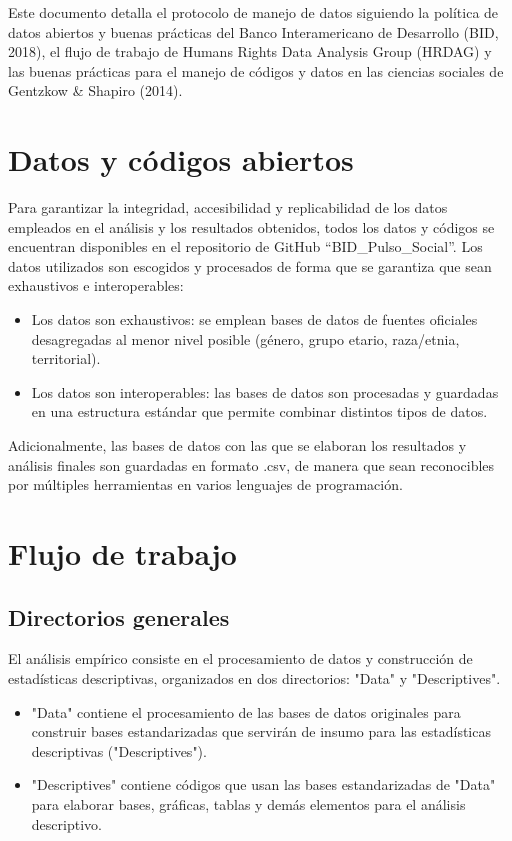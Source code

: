 Este documento detalla el protocolo de manejo de datos siguiendo la política de datos abiertos y buenas prácticas del Banco Interamericano de Desarrollo (BID, 2018), el flujo de trabajo de Humans Rights Data Analysis Group (HRDAG) y las buenas prácticas para el manejo de códigos y datos en las ciencias sociales de Gentzkow \& Shapiro (2014). 

\section{Datos y códigos abiertos} 
Para garantizar la integridad, accesibilidad y replicabilidad de los datos empleados en el análisis y los resultados obtenidos, todos los datos y códigos se encuentran disponibles en el repositorio de GitHub “BID\_Pulso\_Social”. Los datos utilizados son escogidos y procesados de forma que se garantiza que sean exhaustivos e interoperables:
\begin{itemize}
    \item Los datos son exhaustivos: se emplean bases de datos de fuentes oficiales desagregadas al menor nivel posible (género, grupo etario, raza/etnia, territorial).
    \item Los datos son interoperables: las bases de datos son procesadas y guardadas en una estructura estándar que permite combinar distintos tipos de datos.
\end{itemize}

Adicionalmente, las bases de datos con las que se elaboran los resultados y análisis finales son guardadas en formato .csv, de manera que sean reconocibles por múltiples herramientas en varios lenguajes de programación.
 
\section{Flujo de trabajo}

\subsection{Directorios generales}
El análisis empírico consiste en el procesamiento de datos y construcción de estadísticas descriptivas, organizados en dos directorios: "Data" y "Descriptives".

\begin{itemize}
    \item "Data" contiene el procesamiento de las bases de datos originales para construir bases estandarizadas que servirán de insumo para las estadísticas descriptivas ("Descriptives").
    \item "Descriptives" contiene códigos que usan las bases estandarizadas de "Data" para elaborar bases, gráficas, tablas y demás elementos para el análisis descriptivo.

\end{itemize}


